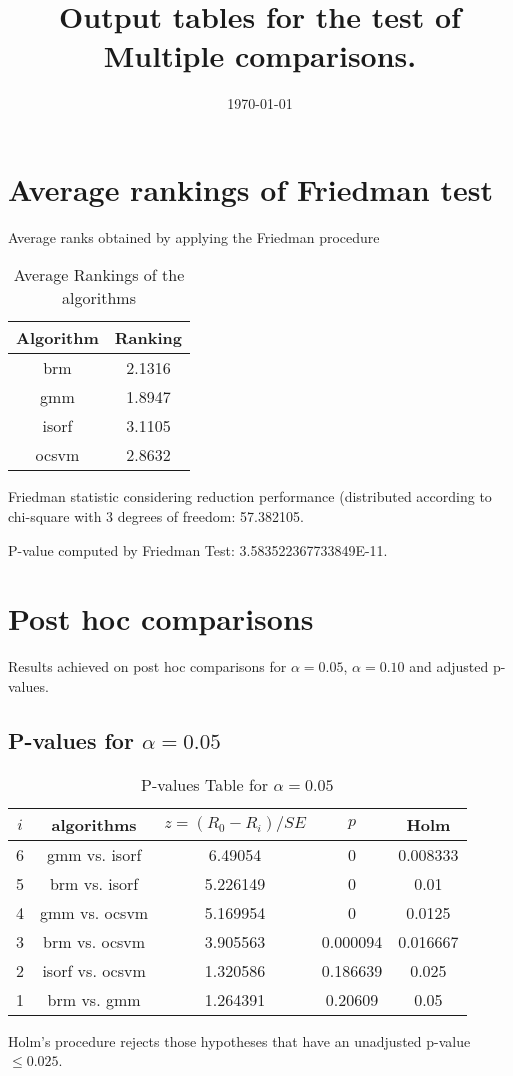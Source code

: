 \documentclass[a4paper,10pt]{article}
\title{Output tables for the test of Multiple comparisons.}
\author{}
\date{\today}
\begin{document}
\begin{landscape}
\pagestyle{empty}
\maketitle
\thispagestyle{empty}
\section{Average rankings of Friedman test}



Average ranks obtained by applying the Friedman procedure

\begin{table}[!htp]
\centering
\begin{tabular}{|c|c|}\hline
Algorithm&Ranking\\\hline
brm & 2.1316\\
gmm & 1.8947\\
isorf & 3.1105\\
ocsvm & 2.8632\\
\hline
\end{tabular}
\caption{Average Rankings of the algorithms}
\end{table}

Friedman statistic considering reduction performance (distributed according to chi-square with 3 degrees of freedom: 57.382105.

P-value computed by Friedman Test: 3.583522367733849E-11.\newline



\pagebreak

\section{Post hoc comparisons}

Results achieved on post hoc comparisons for $\alpha = 0.05$, $\alpha = 0.10$ and adjusted p-values.

\subsection{P-values for $\alpha=0.05$}

\begin{table}[!htp]
\centering\scriptsize
\begin{tabular}{ccccc}
$i$&algorithms&$z=(R_0 - R_i)/SE$&$p$&Holm\\
\hline6&gmm vs. isorf&6.49054&0&0.008333\\
5&brm vs. isorf&5.226149&0&0.01\\
4&gmm vs. ocsvm&5.169954&0&0.0125\\
3&brm vs. ocsvm&3.905563&0.000094&0.016667\\
2&isorf vs. ocsvm&1.320586&0.186639&0.025\\
1&brm vs. gmm&1.264391&0.20609&0.05\\
\hline
\end{tabular}
\caption{P-values Table for $\alpha=0.05$}
\end{table}Holm's procedure rejects those hypotheses that have an unadjusted p-value $\le0.025$.


\end{landscape}
\end{document}
